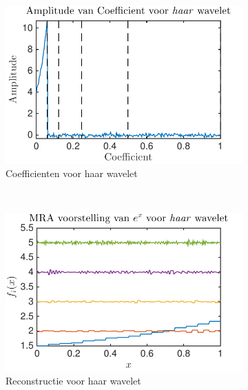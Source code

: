 \begin{figure}
    \centering
     \begin{subfigure}[b]{0.4\textwidth}
            \includegraphics[width=\textwidth]{../src/denoising/haar_Noise/coef_exp_haar_4_noise_10}
            \caption{Coefficienten voor haar wavelet}
        \end{subfigure}
        ~ %
        \begin{subfigure}[b]{0.4\textwidth}
            \includegraphics[width=\textwidth]{../src/denoising/haar_Noise/MRA_exp_haar_4_noise_10}
            \caption{Reconstructie voor haar wavelet}
        \end{subfigure}
    \begin{subfigure}[b]{0.4\textwidth}

\end{subfigure}
\end{figure}
